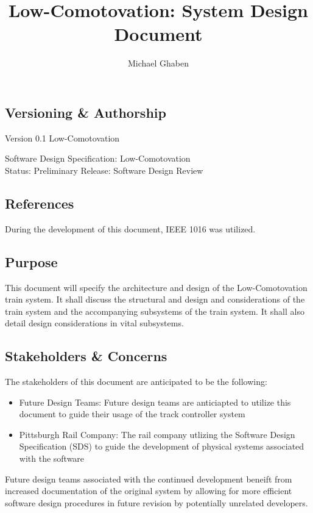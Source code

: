 \documentclass[]{article}
\title{Low-Comotovation: System Design Document}
\author{Michael Ghaben}
\date{}
\begin{document}
\maketitle
\tableofcontents
\titlepage

\subsection{Versioning \& Authorship}
Version 0.1
\newline
Low-Comotovation \textcopyright

\raggedright
Software Design Specification: Low-Comotovation \\
Status: Preliminary Release: Software Design Review

\subsection{References}
During the development of this document, IEEE 1016 was utilized.

\subsection{Purpose}
This document will specify the architecture and design of the Low-Comotovation train system. It shall discuss the structural and design and considerations of the train system and the accompanying subsystems of the train system. It shall also detail design considerations in vital subsystems.

\subsection{Stakeholders \& Concerns}
The stakeholders of this document are anticipated to be the following:
\begin{itemize}
	\item Future Design Teams: Future design teams are anticiapted to utilize this document to guide their usage of the track controller system
	\item Pittsburgh Rail Company: The rail company utlizing the Software Design Specification (SDS) to guide the development of physical systems associated with the software
\end{itemize}

Future design teams associated with the continued development beneift from increased documentation of the original system by allowing for more efficient software design procedures in future revision by potentially unrelated developers.
\end{document}
